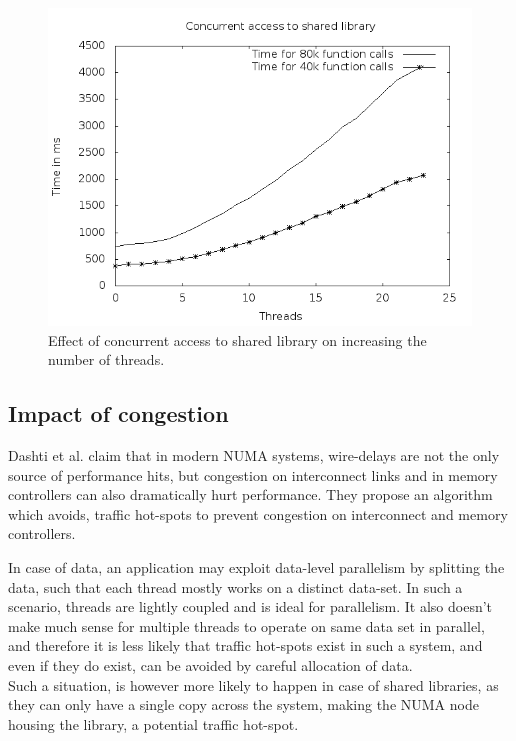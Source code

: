 \begin{figure}
    \centering
    \includegraphics[scale=0.39]{timevsthread_noMem.png}
    \caption{Effect of concurrent access to shared library on increasing the number of threads.}
    \label{fig:timevsthread.png}
\end{figure}

\subsection{Impact of congestion}
Dashti et al. \cite{Dashti:2013:TMH:2490301.2451157} claim that in modern NUMA systems, wire-delays
are not the only source of performance hits, but congestion on interconnect links and in memory 
controllers can also dramatically hurt performance. They propose an algorithm which avoids, traffic
hot-spots to prevent congestion on interconnect and memory controllers.

In case of data, an application may exploit data-level parallelism by splitting the data, such that
each thread mostly works on a distinct data-set. In such a scenario, threads are lightly coupled and
is ideal for parallelism. It also doesn't make much sense for multiple threads to operate on 
same data set in parallel, and therefore it is less likely that traffic hot-spots exist in such a system,
and even if they do exist, can be avoided by careful allocation of data.\\
Such a situation, is however more likely to happen in case of shared libraries, as they can only have
a single copy across the system, making the NUMA node housing the library, a potential traffic hot-spot.


